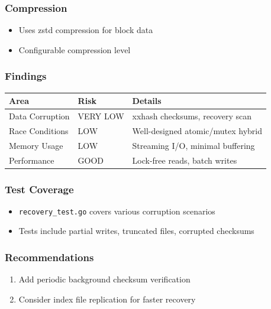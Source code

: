 \documentclass[
]{article}
\newcounter{none} %
\providecommand{\tightlist}{%
  \setlength{\itemsep}{0pt}\setlength{\parskip}{0pt}}
\begin{document}
\subsubsection{Compression}\label{compression}

\begin{itemize}
\tightlist
\item
  Uses zstd compression for block data
\item
  Configurable compression level
\end{itemize}

\subsubsection{Findings}\label{findings-3}

{\def\LTcaptype{none} %
\begin{longtable}[]{@{}lll@{}}
\toprule\noalign{}
Area & Risk & Details \\
\midrule\noalign{}
\endhead
\bottomrule\noalign{}
\endlastfoot
Data Corruption & VERY LOW & xxhash checksums, recovery scan \\
Race Conditions & LOW & Well-designed atomic/mutex hybrid \\
Memory Usage & LOW & Streaming I/O, minimal buffering \\
Performance & GOOD & Lock-free reads, batch writes \\
\end{longtable}
}

\subsubsection{Test Coverage}\label{test-coverage}

\begin{itemize}
\tightlist
\item
  \texttt{recovery\_test.go} covers various corruption scenarios
\item
  Tests include partial writes, truncated files, corrupted checksums
\end{itemize}

\subsubsection{Recommendations}\label{recommendations-3}

\begin{enumerate}
\def\labelenumi{\arabic{enumi}.}
\tightlist
\item
  Add periodic background checksum verification
\item
  Consider index file replication for faster recovery
\end{enumerate}
\end{document}
